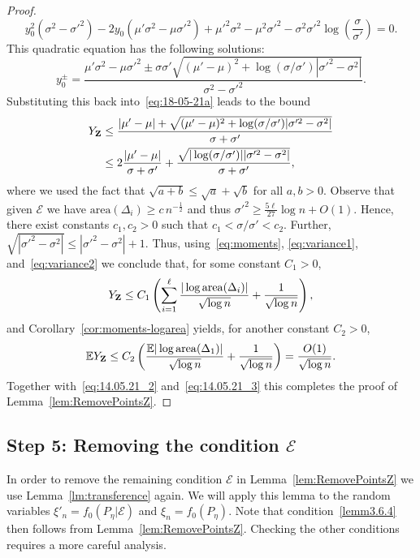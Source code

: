 \documentclass[10pt]{amsart}
\theoremstyle{definition}\newtheorem{defi}[theo]{Definition}\newtheorem{rema}[theo]{Remark}\newtheorem{exam}[theo]{Example}\newtheorem{exem}[theo]{Example}\newtheorem{nota}[theo]{Notation}
\newcommand{\bbE}{\mathbb{E}}
\newcommand{\clE}{\mathcal{E}}
\newcommand{\area}{\mathrm{area}}
\begin{document}
\begin{proof}
\[
y_0^2\left(\sigma^2-\sigma'^2\right)-2y_0\left(\mu'\sigma^2-\mu\sigma'^2\right)+\mu'^2\sigma^2-\mu^2\sigma'^2-\sigma^2\sigma'^2\log\left(\frac{\sigma}{\sigma'}\right)=0.
\]
This quadratic equation has the following solutions:
\[
y^{\pm}_0=\frac{\mu'\sigma^2-\mu\sigma'^2\pm\sigma\sigma'\sqrt{(\mu'-\mu)^2+\log(\sigma/\sigma')|\sigma'^2-\sigma^2|}}{\sigma^2-\sigma'^2}.
\]
Substituting this back into~\eqref{eq:18-05-21a} leads to the bound
\begin{align*}
Y_{\bf{Z}} & \leq \frac{|\mu'-\mu|+\sqrt{(\mu'-\mu)^2+\log(\sigma/\sigma')|\sigma'^2-\sigma^2|}}{\sigma+\sigma'}
\\ & \leq 2\frac{|\mu'-\mu|}{\sigma+\sigma'} + \frac{\sqrt{|\log(\sigma/ \sigma')||\sigma'^2-\sigma^2|}}{\sigma+\sigma'},
\end{align*}
where we used the fact that $\sqrt{a+b} \leq \sqrt a + \sqrt b$ for all $a,b>0$. Observe that given $\clE$ we have ${\area}(\Delta_i) \geq c\, n^{- \frac 12}$ and thus $\sigma'^2 \geq \frac{5 \ell}{27}\log n +O(1)$. Hence, there exist constants $c_1,c_2>0$ such that $c_1<\sigma/\sigma'<c_2$. Further, $\sqrt{|\sigma'^2-\sigma^2|} \leq |\sigma'^2-\sigma^2|+1$. Thus, using~\eqref{eq:moments}, \eqref{eq:variance1}, and~\eqref{eq:variance2} we conclude that, for some constant $C_1>0$,
\[
Y_{\bf{Z}}\leq C_1\left(\sum_{i=1}^\ell \frac{|\log{\area}(\Delta_i)|}{\sqrt{\log n}}+\frac{1}{\sqrt{\log n}}\right),
\]
and Corollary~\ref{cor:moments-logarea} yields, for another constant $C_2>0$,
\[
\bbE Y_{\bf{Z}}\leq C_2\left(\frac{\bbE|\log{\area}(\Delta_1)|}{\sqrt{\log n}}+\frac{1}{\sqrt{\log n}} \right) = \frac{O(1)}{\sqrt{\log n}}.
\]
Together with~\eqref{eq:14.05.21_2} and~\eqref{eq:14.05.21_3} this completes the proof of Lemma~\ref{lem:RemovePointsZ}.
\end{proof}



\subsection{Step 5: Removing the condition \texorpdfstring{$\clE$}{E}}
\label{step5}

In order to remove the remaining condition $\clE$ in Lemma~\ref{lem:RemovePointsZ} we use Lemma~\ref{lm:transference} again. We will apply this lemma to the random variables $\xi'_n=f_0(P_{\eta}|\clE)$ and $\xi_n=f_0(P_{\eta})$. Note that condition~\eqref{lemm3.6.4} then follows from Lemma~\ref{lem:RemovePointsZ}. Checking the other conditions requires a more careful analysis.
\end{document}
